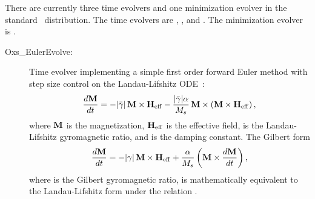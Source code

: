 There are currently three time evolvers and one minimization evolver in the
standard \OOMMF\ distribution.  The time evolvers are
,
, and
.
The minimization evolver is
.
\begin{description}
\item[Oxs\_EulerEvolve:\label{HTMLEulerEvolve}]
%
Time evolver implementing a simple first order forward Euler method with
step size control on the Landau-Lifshitz
ODE~\cite{gilbert1955,landau1935}:\\
\begin{equation}
\htmlimage{antialias}
  \frac{d\vM}{dt} = -|\bar{\gamma}|\,\vM\times\vH_{\rm eff}
   - \frac{|\bar{\gamma}|\alpha}{M_s}\,
     \vM\times\left(\vM\times\vH_{\rm eff}\right),
\label{eq:oxsllode}
\end{equation}
where $\textbf{M}$ is the magnetization, $\textbf{H}_{\rm eff}$ is the effective
field, \abovemath{\bar{\gamma}} is the Landau-Lifshitz gyromagnetic ratio, and
\abovemath{\alpha} is the damping constant. The Gilbert form
\begin{equation}
\htmlimage{antialias}
  \frac{d\vM}{dt} = -|\gamma|\,\vM\times\vH_{\rm eff}
   + \frac{\alpha}{M_s}
     \left(\vM\times\frac{d\vM}{dt}\right),
\label{eq:oxsllgode}
\end{equation}
where \abovemath{\gamma} is the Gilbert gyromagnetic ratio, is
mathematically equivalent to the Landau-Lifshitz form under the
relation .


\end{description}
